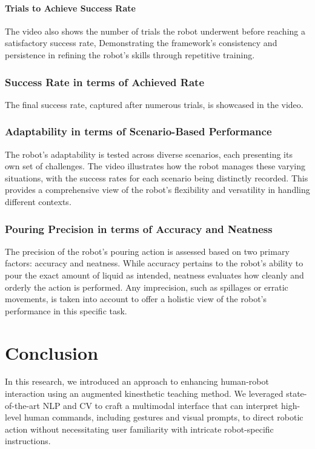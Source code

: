 \documentclass[conference]{IEEEtran}
\begin{document}
\paragraph{Trials to Achieve Success Rate}
The video also shows the number of trials the robot underwent before reaching a satisfactory success rate, Demonstrating the framework's consistency and persistence in refining the robot's skills through repetitive training.

\subsubsection{Success Rate in terms of Achieved Rate}
The final success rate, captured after numerous trials, is showcased in the video. 

\subsubsection{Adaptability in terms of Scenario-Based Performance}

The robot's adaptability is tested across diverse scenarios, each presenting its own set of challenges. The video illustrates how the robot manages these varying situations, with the success rates for each scenario being distinctly recorded. This provides a comprehensive view of the robot's flexibility and versatility in handling different contexts.

\subsubsection{Pouring Precision in terms of Accuracy and Neatness}
The precision of the robot's pouring action is assessed based on two primary factors: accuracy and neatness. While accuracy pertains to the robot's ability to pour the exact amount of liquid as intended, neatness evaluates how cleanly and orderly the action is performed. Any imprecision, such as spillages or erratic movements, is taken into account to offer a holistic view of the robot's performance in this specific task.

\section{Conclusion}

In this research, we introduced an approach to enhancing human-robot interaction using an augmented kinesthetic teaching method. We leveraged state-of-the-art NLP and CV to craft a multimodal interface that can interpret high-level human commands, including gestures and visual prompts, to direct robotic action without necessitating user familiarity with intricate robot-specific instructions.
\end{document}
